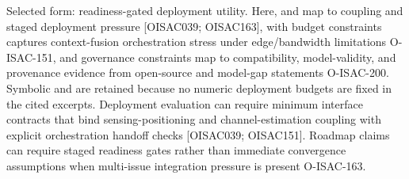 {}
\markdownRendererSectionEnd \markdownRendererSectionBegin
{}\markdownRendererInterblockSeparator
{}Selected form: readiness-gated deployment utility.\markdownRendererParagraphSeparator
{}\markdownRendererParagraphSeparator
{}Here,  and  map to coupling and staged deployment pressure [O\markdownRendererUnderscore{}ISAC\markdownRendererUnderscore{}039; O\markdownRendererUnderscore{}ISAC\markdownRendererUnderscore{}163],  with budget constraints captures context-fusion orchestration stress under edge/bandwidth limitations O-ISAC-151, and governance constraints map to compatibility, model-validity, and provenance evidence from open-source and model-gap statements O-ISAC-200. Symbolic  and  are retained because no numeric deployment budgets are fixed in the cited excerpts.\markdownRendererInterblockSeparator
{}
\markdownRendererSectionEnd \markdownRendererSectionBegin
{}\markdownRendererInterblockSeparator
{}\markdownRendererUlBeginTight
\markdownRendererUlItem Deployment evaluation can require minimum interface contracts that bind sensing-positioning and channel-estimation coupling with explicit orchestration handoff checks [O\markdownRendererUnderscore{}ISAC\markdownRendererUnderscore{}039; O\markdownRendererUnderscore{}ISAC\markdownRendererUnderscore{}151].\markdownRendererUlItemEnd 
\markdownRendererUlItem Roadmap claims can require staged readiness gates rather than immediate convergence assumptions when multi-issue integration pressure is present O-ISAC-163.\markdownRendererUlItemEnd 
